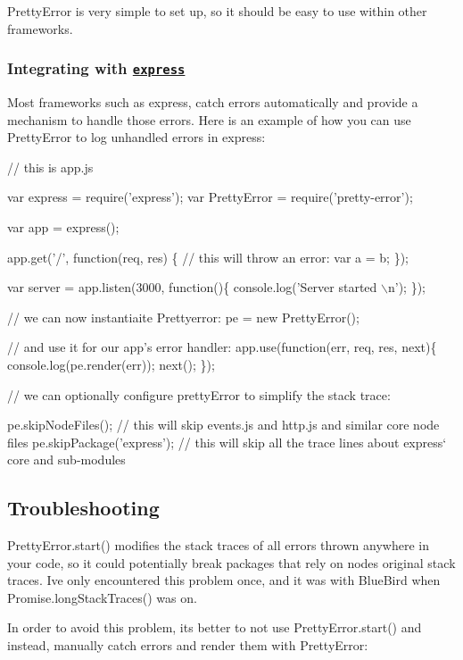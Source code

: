 Pretty\+Error is very simple to set up, so it should be easy to use within other frameworks.

\subsubsection*{Integrating with \href{https://github.com/visionmedia/express}{\tt express}}

Most frameworks such as express, catch errors automatically and provide a mechanism to handle those errors. Here is an example of how you can use Pretty\+Error to log unhandled errors in express\+:


\begin{DoxyCode}
// this is app.js

var express = require('express');
var PrettyError = require('pretty-error');

var app = express();

app.get('/', function(req, res) \{
   // this will throw an error:
   var a = b;
\});

var server = app.listen(3000, function()\{
   console.log('Server started \(\backslash\)n');
\});


// we can now instantiaite Prettyerror:
pe = new PrettyError();

// and use it for our app's error handler:
app.use(function(err, req, res, next)\{
   console.log(pe.render(err));
   next();
\});

// we can optionally configure prettyError to simplify the stack trace:

pe.skipNodeFiles(); // this will skip events.js and http.js and similar core node files
pe.skipPackage('express'); // this will skip all the trace lines about express` core and sub-modules
\end{DoxyCode}


\subsection*{Troubleshooting}

{\ttfamily Pretty\+Error.\+start()} modifies the stack traces of all errors thrown anywhere in your code, so it could potentially break packages that rely on node\textquotesingle{}s original stack traces. I\textquotesingle{}ve only encountered this problem once, and it was with Blue\+Bird when {\ttfamily Promise.\+long\+Stack\+Traces()} was on.

In order to avoid this problem, it\textquotesingle{}s better to not use {\ttfamily Pretty\+Error.\+start()} and instead, manually catch errors and render them with Pretty\+Error\+:


